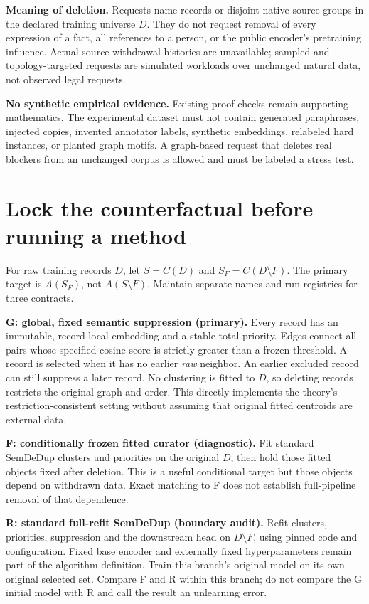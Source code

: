 \documentclass[11pt,a4paper]{article}
\newcommand{\minus}{\setminus}
\begin{document}
\textbf{Meaning of deletion.} Requests name records or disjoint native source groups in the declared training universe $D$. They do not request removal of every expression of a fact, all references to a person, or the public encoder's pretraining influence. Actual source withdrawal histories are unavailable; sampled and topology-targeted requests are simulated workloads over unchanged natural data, not observed legal requests.

\textbf{No synthetic empirical evidence.} Existing proof checks remain supporting mathematics. The experimental dataset must not contain generated paraphrases, injected copies, invented annotator labels, synthetic embeddings, relabeled hard instances, or planted graph motifs. A graph-based request that deletes real blockers from an unchanged corpus is allowed and must be labeled a stress test.

\section{Lock the counterfactual before running a method}
For raw training records $D$, let $S=C(D)$ and $S_F=C(D\minus F)$. The primary target is $A(S_F)$, not $A(S\minus F)$. Maintain separate names and run registries for three contracts.

\textbf{G: global, fixed semantic suppression (primary).} Every record has an immutable, record-local embedding and a stable total priority. Edges connect all pairs whose specified cosine score is strictly greater than a frozen threshold. A record is selected when it has no earlier \emph{raw} neighbor. An earlier excluded record can still suppress a later record. No clustering is fitted to $D$, so deleting records restricts the original graph and order. This directly implements the theory's restriction-consistent setting without assuming that original fitted centroids are external data.

\textbf{F: conditionally frozen fitted curator (diagnostic).} Fit standard SemDeDup clusters and priorities on the original $D$, then hold those fitted objects fixed after deletion. This is a useful conditional target but those objects depend on withdrawn data. Exact matching to F does not establish full-pipeline removal of that dependence.

\textbf{R: standard full-refit SemDeDup (boundary audit).} Refit clusters, priorities, suppression and the downstream head on $D\minus F$, using pinned code and configuration. Fixed base encoder and externally fixed hyperparameters remain part of the algorithm definition. Train this branch's original model on its own original selected set. Compare F and R within this branch; do not compare the G initial model with R and call the result an unlearning error.
\end{document}
